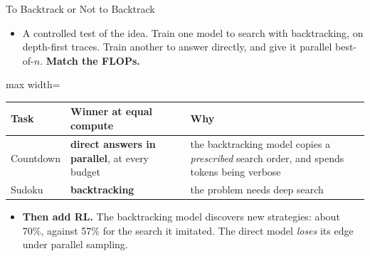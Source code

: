 \begin{frame}{To Backtrack or Not to Backtrack}
    \begin{itemize}\itemsep0.4em
        \item A controlled test of the idea. Train one model to search with backtracking, on depth-first traces. Train another to answer directly, and give it parallel best-of-$n$. \textbf{Match the FLOPs.}
    \end{itemize}
    \begin{center}
    \small
    \renewcommand{\arraystretch}{1.15}
    \begin{adjustbox}{max width=\linewidth}\begin{tabular}{>{\raggedright\arraybackslash}p{2.6cm}>{\raggedright\arraybackslash}p{4.6cm}>{\raggedright\arraybackslash}p{6.2cm}}
        \toprule
        \textbf{Task} & \textbf{Winner at equal compute} & \textbf{Why} \\
        \midrule
        Countdown & \textbf{direct answers in parallel}, at every budget & the backtracking model copies a \emph{prescribed} search order, and spends tokens being verbose \\
        Sudoku & \textbf{backtracking} & the problem needs deep search \\
        \bottomrule
    \end{tabular}\end{adjustbox}
    \end{center}
    \begin{itemize}\itemsep0.4em
        \item \textbf{Then add RL.} The backtracking model discovers new strategies: about 70\%, against 57\% for the search it imitated. The direct model \emph{loses} its edge under parallel sampling.
    \end{itemize}
    \vspace{0.1em}
\end{frame}

